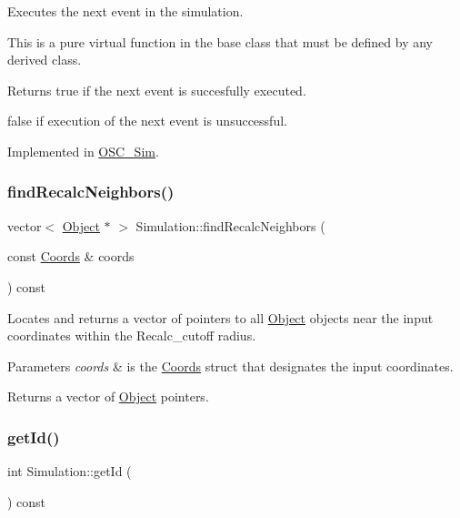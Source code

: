Executes the next event in the simulation. 

This is a pure virtual function in the base class that must be defined by any derived class. \begin{DoxyReturn}{Returns}
true if the next event is succesfully executed. 

false if execution of the next event is unsuccessful. 
\end{DoxyReturn}


Implemented in \hyperlink{class_o_s_c___sim_a41bdb6368c71e1a3cb0efdc2a55d7869}{O\+S\+C\+\_\+\+Sim}.

\mbox{\label{class_simulation_aa6501dc60b4a3981f6ca44cec861364a}} 
\subsubsection{\texorpdfstring{find\+Recalc\+Neighbors()}{findRecalcNeighbors()}}
{\footnotesize\ttfamily vector$<$ \hyperlink{class_object}{Object} $\ast$ $>$ Simulation\+::find\+Recalc\+Neighbors (\begin{DoxyParamCaption}\item[{const \hyperlink{struct_coords}{Coords} \&}]{coords }\end{DoxyParamCaption}) const\hspace{0.3cm}{\ttfamily [protected]}}



Locates and returns a vector of pointers to all \hyperlink{class_object}{Object} objects near the input coordinates within the Recalc\+\_\+cutoff radius. 


\begin{DoxyParams}{Parameters}
{\em coords} & is the \hyperlink{struct_coords}{Coords} struct that designates the input coordinates. \\
\hline
\end{DoxyParams}
\begin{DoxyReturn}{Returns}
a vector of \hyperlink{class_object}{Object} pointers. 
\end{DoxyReturn}
\mbox{\label{class_simulation_aff40f268758bd9a0f390a649fc45c05e}} 
\subsubsection{\texorpdfstring{get\+Id()}{getId()}}
{\footnotesize\ttfamily int Simulation\+::get\+Id (\begin{DoxyParamCaption}{ }\end{DoxyParamCaption}) const}



